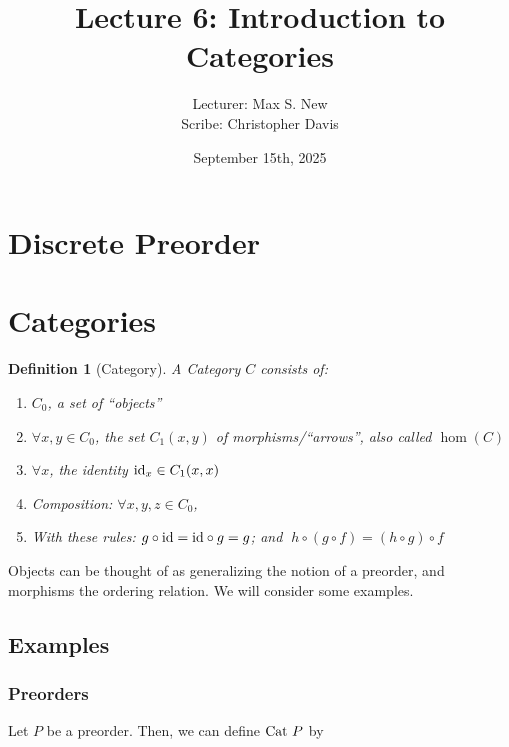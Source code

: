 \documentclass[12pt]{article}
\newtheorem{definition}{Definition}
\begin{document}
\title{Lecture 6: Introduction to Categories}
\author{Lecturer: Max S. New\\ Scribe: Christopher Davis}
\date{September 15th, 2025}
\maketitle



\section{Discrete Preorder}

\section{Categories}

\begin{definition}[Category]
A Category $C$ consists of:
\begin{enumerate}
    \item $C_0$, a set of ``objects''
    \item $\forall x,y \in C_0$, the set $C_1(x,y)$ of morphisms/``arrows'', also called $\hom(C)$
    \item $\forall x$, the identity $\text{\textup{id}}_x \in C_1(x,x)$
    \item Composition: $\forall x,y,z \in C_0$,
    \begin{mathpar}
    \end{mathpar}
    \item With these rules: $g \circ \textup{id} = \textup{id} \circ g = g$; and $\;h \circ (g \circ f) = (h \circ g) \circ f$
\end{enumerate}

\end{definition}

Objects can be thought of as generalizing the notion of a preorder, and morphisms the ordering relation. We will consider some examples.


\subsection{Examples}

\subsubsection{Preorders}
Let $P$ be a preorder. Then, we can define $\textmd{Cat } P$ by
\end{document}

